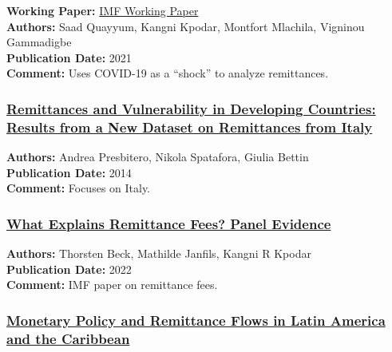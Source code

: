 \documentclass[
  11pt,
]{article}
\begin{document}
\textbf{Working Paper:}
\href{https://www.imf.org/en/Publications/WP/Issues/2021/07/16/Defying-the-Odds-Remittances-During-the-COVID-19-Pandemic-461321}{IMF
Working Paper}\\
\textbf{Authors:} Saad Quayyum, Kangni Kpodar, Montfort Mlachila,
Vigninou Gammadigbe\\
\textbf{Publication Date:} 2021\\
\textbf{Comment:} Uses COVID-19 as a ``shock'' to analyze remittances.

\subsubsection{\texorpdfstring{\href{https://cepr.org/voxeu/columns/remittances-and-vulnerability-developing-countries-results-new-dataset-remittances}{Remittances
and Vulnerability in Developing Countries: Results from a New Dataset on
Remittances from
Italy}}{Remittances and Vulnerability in Developing Countries: Results from a New Dataset on Remittances from Italy}}\label{remittances-and-vulnerability-in-developing-countries-results-from-a-new-dataset-on-remittances-from-italy}

\textbf{Authors:} Andrea Presbitero, Nikola Spatafora, Giulia Bettin\\
\textbf{Publication Date:} 2014\\
\textbf{Comment:} Focuses on Italy.

\subsubsection{\texorpdfstring{\href{https://www.elibrary.imf.org/view/journals/001/2022/087/article-A001-en.xml}{What
Explains Remittance Fees? Panel
Evidence}}{What Explains Remittance Fees? Panel Evidence}}\label{what-explains-remittance-fees-panel-evidence}

\textbf{Authors:} Thorsten Beck, Mathilde Janfils, Kangni R Kpodar\\
\textbf{Publication Date:} 2022\\
\textbf{Comment:} IMF paper on remittance fees.

\subsubsection{\texorpdfstring{\href{https://pmc.ncbi.nlm.nih.gov/articles/PMC9510564/pdf/10290_2022_Article_478.pdf}{Monetary
Policy and Remittance Flows in Latin America and the
Caribbean}}{Monetary Policy and Remittance Flows in Latin America and the Caribbean}}\label{monetary-policy-and-remittance-flows-in-latin-america-and-the-caribbean}
\end{document}
